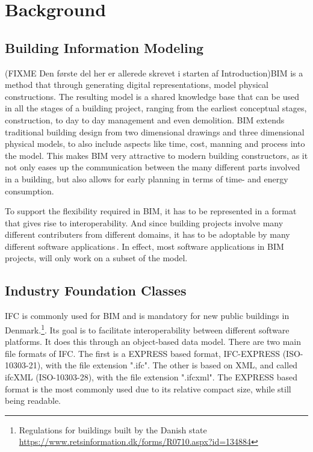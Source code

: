 \section{Background}
\label{sec:background}
\subsection{Building Information Modeling}
\label{sec:building_information_modeling}
(FIXME Den første del her er allerede skrevet i starten af Introduction)BIM is a method that through generating digital representations, model physical constructions. The resulting model is a shared knowledge base that can be used in all the stages of a building project, ranging from the earliest conceptual stages, construction, to day to day management and even demolition. BIM extends traditional building design from two dimensional drawings and three dimensional physical models, to also include aspects like time, cost, manning and process into the model. This makes BIM very attractive to modern building constructors, as it not only eases up the communication between the many different parts involved in a building, but also allows for early planning in terms of time- and energy consumption.

To support the flexibility required in BIM, it has to be represented in a format that gives rise to interoperability. And since building projects involve many different contributers from different domains, it has to be adoptable by many different software applications\,\cite{quteprints37725}. In effect, most software applications in BIM projects, will only work on a subset of the model.
\subsection{Industry Foundation Classes}
IFC is commonly used for BIM and is mandatory for new public buildings in Denmark.\footnote{Regulations for buildings built by the Danish state \url{https://www.retsinformation.dk/forms/R0710.aspx?id=134884}}. Its goal is to facilitate interoperability between different software platforms. It does this through an object-based data model. There are two main file formats of IFC. The first is a EXPRESS based format, IFC-EXPRESS (ISO-10303-21), with the file extension ".ifc". The other is based on XML, and called ifcXML (ISO-10303-28), with the file extension ".ifcxml". The EXPRESS based format is the most commonly used due to its relative compact size, while still being readable.

